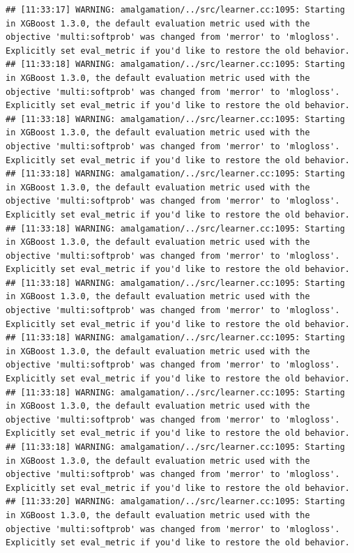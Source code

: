\documentclass[
]{scrbook}
\begin{document}
\begin{verbatim}
## [11:33:17] WARNING: amalgamation/../src/learner.cc:1095: Starting in XGBoost 1.3.0, the default evaluation metric used with the objective 'multi:softprob' was changed from 'merror' to 'mlogloss'. Explicitly set eval_metric if you'd like to restore the old behavior.
## [11:33:18] WARNING: amalgamation/../src/learner.cc:1095: Starting in XGBoost 1.3.0, the default evaluation metric used with the objective 'multi:softprob' was changed from 'merror' to 'mlogloss'. Explicitly set eval_metric if you'd like to restore the old behavior.
## [11:33:18] WARNING: amalgamation/../src/learner.cc:1095: Starting in XGBoost 1.3.0, the default evaluation metric used with the objective 'multi:softprob' was changed from 'merror' to 'mlogloss'. Explicitly set eval_metric if you'd like to restore the old behavior.
## [11:33:18] WARNING: amalgamation/../src/learner.cc:1095: Starting in XGBoost 1.3.0, the default evaluation metric used with the objective 'multi:softprob' was changed from 'merror' to 'mlogloss'. Explicitly set eval_metric if you'd like to restore the old behavior.
## [11:33:18] WARNING: amalgamation/../src/learner.cc:1095: Starting in XGBoost 1.3.0, the default evaluation metric used with the objective 'multi:softprob' was changed from 'merror' to 'mlogloss'. Explicitly set eval_metric if you'd like to restore the old behavior.
## [11:33:18] WARNING: amalgamation/../src/learner.cc:1095: Starting in XGBoost 1.3.0, the default evaluation metric used with the objective 'multi:softprob' was changed from 'merror' to 'mlogloss'. Explicitly set eval_metric if you'd like to restore the old behavior.
## [11:33:18] WARNING: amalgamation/../src/learner.cc:1095: Starting in XGBoost 1.3.0, the default evaluation metric used with the objective 'multi:softprob' was changed from 'merror' to 'mlogloss'. Explicitly set eval_metric if you'd like to restore the old behavior.
## [11:33:18] WARNING: amalgamation/../src/learner.cc:1095: Starting in XGBoost 1.3.0, the default evaluation metric used with the objective 'multi:softprob' was changed from 'merror' to 'mlogloss'. Explicitly set eval_metric if you'd like to restore the old behavior.
## [11:33:18] WARNING: amalgamation/../src/learner.cc:1095: Starting in XGBoost 1.3.0, the default evaluation metric used with the objective 'multi:softprob' was changed from 'merror' to 'mlogloss'. Explicitly set eval_metric if you'd like to restore the old behavior.
## [11:33:20] WARNING: amalgamation/../src/learner.cc:1095: Starting in XGBoost 1.3.0, the default evaluation metric used with the objective 'multi:softprob' was changed from 'merror' to 'mlogloss'. Explicitly set eval_metric if you'd like to restore the old behavior.

\end{verbatim}
\end{document}

